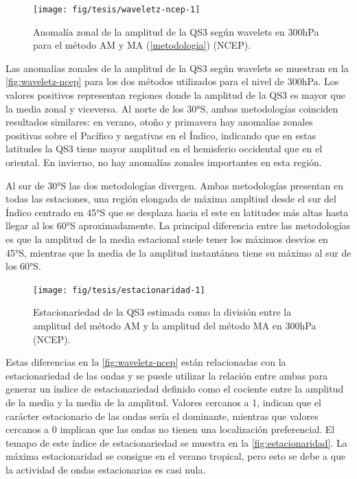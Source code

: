 \documentclass[spanish,a4paper,12pt,oneside]{book}
\begin{document}
\begin{figure}

{\centering \texttt{[image: fig/tesis/waveletz-ncep-1]} 

}

\caption{Anomalía zonal de la amplitud de la QS3 según wavelets en 300hPa para el método AM y MA (\autoref{metodologia}) (NCEP).}\label{fig:waveletz-ncep}
\end{figure}

Las anomalías zonales de la amplitud de la QS3 según wavelets se
muestran en la \autoref{fig:waveletz-ncep} para los dos métodos
utilizados para el nivel de 300hPa. Los valores positivos representan
regiones donde la amplitud de la QS3 es mayor que la media zonal y
viceversa. Al norte de los 30°S, ambas metodologías coinciden resultados
similares: en verano, otoño y primavera hay anomalías zonales positivas
sobre el Pacífico y negativas en el Índico, indicando que en estas
latitudes la QS3 tiene mayor amplitud en el hemisferio occidental que en
el oriental. En invierno, no hay anomalías zonales importantes en esta
región.

Al sur de 30°S las dos metodologías divergen. Ambas metodologías
presentan en todas las estaciones, una región elongada de máxima
ampltiud desde el sur del Índico centrado en 45°S que se desplaza hacia
el este en latitudes más altas hasta llegar al los 60°S aproximadamente.
La principal diferencia entre las metodologías es que la amplitud de la
media estacional suele tener los máximos desvíos en 45°S, mientras que
la media de la amplitud instantánea tiene su máximo al sur de los 60°S.

\begin{figure}
\texttt{[image: fig/tesis/estacionaridad-1]} \caption{Estacionariedad de la QS3 estimada como la división entre la amplitud del método AM y la amplitud del método MA en 300hPa (NCEP).}\label{fig:estacionaridad}
\end{figure}

Estas diferencias en la \autoref{fig:waveletz-ncep} están relacionadas
con la estacionariedad de las ondas y se puede utilizar la relación
entre ambas para generar un índice de estacionariedad definido como el
cociente entre la amplitud de la media y la media de la amplitud.
Valores cercanos a 1, indican que el carácter estacionario de las ondas
sería el dominante, mientras que valores cercanos a 0 implican que las
ondas no tienen una localización preferencial. El temapo de este índice
de estacionariedad se muestra en la \autoref{fig:estacionaridad}. La
máxima estacionaridad se consigue en el verano tropical, pero esto se
debe a que la actividad de ondas estacionarias es casi nula.
\end{document}
